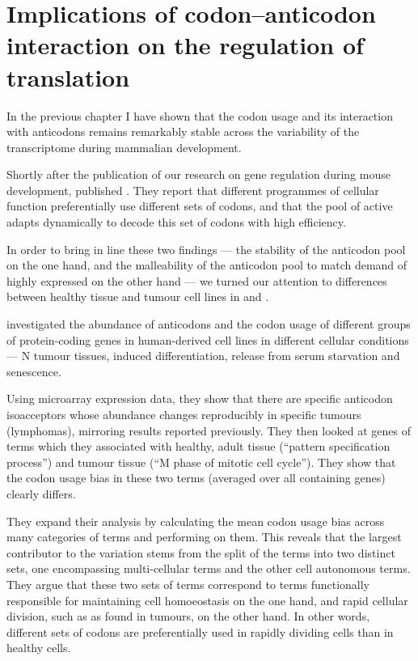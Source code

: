 \chapter{Implications of codon–anticodon interaction on the regulation of translation}

In the previous chapter I have shown that the codon usage and its interaction
with \trna anticodons remains remarkably stable across the variability of the
transcriptome during mammalian development.

Shortly after the publication of our research on \trna gene regulation during
mouse development, \citet{Gingold:2014} published . They
report that different programmes of cellular function preferentially use
different sets of codons, and that the pool of active \trna[s] adapts
dynamically to decode this set of codons with high efficiency.

In order to bring in line these two findings — the stability of the anticodon
pool on the one hand, and the malleability of the anticodon pool to match demand
of highly expressed on the other hand — we turned our attention to differences
between healthy tissue and tumour cell lines in \mmu and \hsa.


\citet{Gingold:2014} investigated the abundance of \trna anticodons and the
codon usage of different groups of protein-coding genes in human-derived cell
lines in different cellular conditions --- N tumour tissues,
induced differentiation, release from serum starvation and senescence.

Using microarray expression data, they show that there are specific anticodon
isoacceptors whose abundance changes reproducibly in specific tumours
(lymphomas), mirroring results reported previously.
They then looked at genes of \go terms which they associated with healthy, adult
tissue (“pattern specification process”) and tumour tissue (“M phase of mitotic
cell cycle”). They show that the codon usage bias in these two \go terms
(averaged over all containing genes) clearly differs.

They expand their analysis by calculating the mean codon usage bias across many
categories of \go terms and performing \pca on them. This reveals that the
largest contributor to the variation stems from the split of the \go terms into
two distinct sets, one encompassing multi-cellular \go terms and the other cell
autonomous \go terms. They argue that these two sets of \go terms correspond to
\go terms functionally responsible for maintaining cell homoeostasis on the one
hand, and rapid cellular division, such as as found in tumours, on the other
hand. In other words, different sets of codons are preferentially used in
rapidly dividing cells than in healthy cells.

